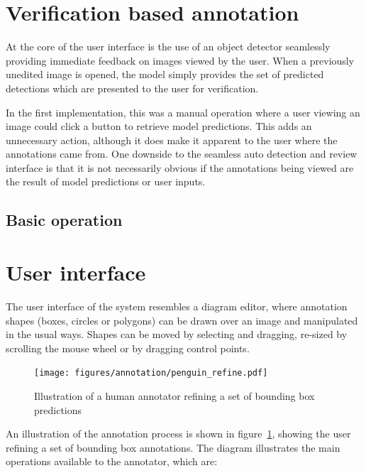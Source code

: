 \section {Verification based annotation}

At the core of the user interface is the use of an object detector seamlessly providing immediate feedback on images viewed by the user. When a previously unedited image is opened, the model simply provides the set of predicted detections which are presented to the user for verification. 

In the first implementation, this was a manual operation where a user viewing an image could click a button to retrieve model predictions. This adds an unnecessary action, although it does make it apparent to the user where the annotations came from. One downside to the seamless auto detection and review interface is that it is not necessarily obvious if the annotations being viewed are the result of model predictions or user inputs.

\subsection{Basic operation}


\section {User interface}
\label{sec:user_interface}
 
The user interface of the system resembles a diagram editor, where annotation shapes (boxes, circles or polygons) can be drawn over an image and manipulated in the usual ways. Shapes can be moved by selecting and dragging, re-sized by scrolling the mouse wheel or by dragging control points. 

\begin{figure}[h!]
  \centering
  \texttt{[image: figures/annotation/penguin\_refine.pdf]}
  \caption{Illustration of a human annotator refining a set of bounding box predictions }   
  \label{fig:penguin_refinement}
\end{figure}

An illustration of the annotation process is shown in figure~\ref{fig:penguin_refinement}, showing the user refining a set of bounding box annotations. The diagram illustrates the main operations available to the annotator, which are:

